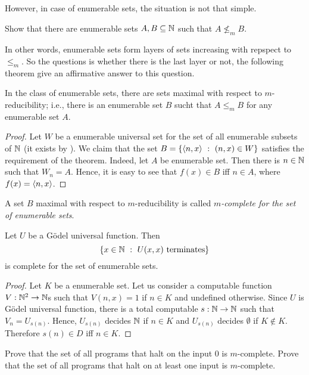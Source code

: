 However, in case of enumerable sets, the situation is not that simple.
\begin{exercise}
  Show that there are enumerable sets $A, B \subseteq {\mathbb{N}}$ such that $A \not\le_m
  B$.
\end{exercise}

In other words, enumerable sets form layers of sets increasing with repspect to
$\le_m$. So the questions is whether there is the last layer or not, the
following theorem give an affirmative answer to this question.
\begin{theorem}
  In the class of enumerable sets, there are sets maximal with respect to
  $m$-reducibility; i.e., there is an enumerable set $B$ sucht that $A \le_m B$
  for any enumerable set $A$.
\end{theorem}
\begin{proof}
  Let $W$ be a enumerable universal set for the set of all enumerable subsets of
  ${\mathbb{N}}$ (it exists by ). 
  We claim that the set $B = \set[(n, x) \in W]{\pair{n}{x}}$ satisfies the
  requirement of the theorem. Indeed, let $A$ be enumerable set. Then there is
  $n \in {\mathbb{N}}$ such that $W_n = A$. Hence, it is easy to see that $f(x) \in B$ iff 
  $n \in A$, where $f(x) = \langle {n}, {x} \rangle$.
\end{proof}

\begin{definition}
  A set $B$ maximal with respect to $m$-reducibility is called
  \emph{$m$-complete for the set of enumerable sets}.
\end{definition}

\begin{theorem}
  Let $U$ be a G\"odel universal function. 
  Then \[
    \set[U(x, x) \text{ terminates}]{x \in \N}
  \]
  is complete for the set of enumerable sets.
\end{theorem}
\begin{proof}
  Let $K$ be a enumerable set. Let us consider a computable function $V : {\mathbb{N}}^2
  \to {\mathbb{N}}$s such that $V(n, x) = 1$ if $n \in K$ and undefined otherwise.
  Since $U$ is G\"odel universal function, there is a total computable $s : {\mathbb{N}}
  \to {\mathbb{N}}$ such that $V_n = U_{s(n)}$. Hence,  $U_{s(n)}$ decides ${\mathbb{N}}$ if 
  $n \in K$ and $U_{s(n)}$ decides $\emptyset$ if $K \not\in K$. 
  Therefore $s(n) \in D$ iff $n \in K$.
\end{proof}

\begin{chapterendexercises}
  \exercise Prove that the set of all programs that halt on the input $0$ is
    $m$-complete. Prove that the set of all programs that halt on at least one
    input is $m$-complete.
\end{chapterendexercises}
